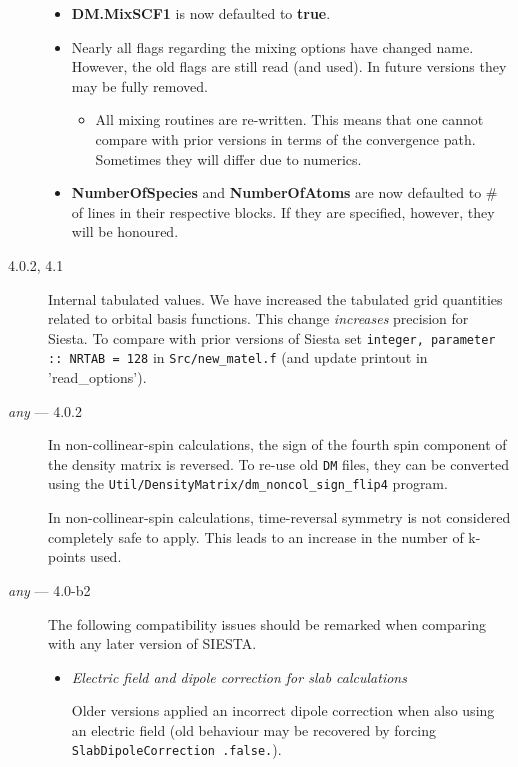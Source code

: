 \documentclass{article}
\newcommand\siesta{\textsc{SIESTA}}
\newcommand{\fdf}[1]{\textbf{#1}}
\newcommand{\code}[1]{\texttt{#1}}
\begin{document}
\begin{description}
\begin{itemize}
    \item %
    \fdf{DM.MixSCF1} is now defaulted to \fdf{true}.

    \item %
    Nearly all flags regarding the mixing options have changed name. However, the old
    flags are still read (and used). In future versions they may be fully removed.

    \begin{itemize}
      \item All mixing routines are re-written. This means that one cannot compare with
      prior versions in terms of the convergence path. Sometimes they will differ due to numerics.
    \end{itemize}

    \item \fdf{NumberOfSpecies} and \fdf{NumberOfAtoms} are now defaulted to \# of lines
    in their respective blocks. If they are specified, however, they will be honoured.

  \end{itemize}


  \item[4.0.2, 4.1] %
  Internal tabulated values. We have increased the tabulated grid quantities related to
  orbital basis functions. This change \emph{increases} precision for Siesta. To compare
  with prior versions of Siesta set \texttt{integer, parameter :: NRTAB = 128} in
  \texttt{Src/new\_matel.f} (and update printout in 'read_options').


  \item[\emph{any} --- 4.0.2] %
  In non-collinear-spin calculations, the sign of the fourth spin
  component of the density matrix is reversed. To re-use old \code{DM} files,
  they can be converted using the
  \code{Util/DensityMatrix/dm_noncol_sign_flip4} program.

  In non-collinear-spin calculations, time-reversal symmetry is not
  considered completely safe to apply. This leads to an increase in
  the number of k-points used.

  \item[\emph{any} --- 4.0-b2] The following compatibility issues should be remarked when
  comparing with any later version of \siesta.

  \begin{itemize}
    \item \emph{Electric field and dipole correction for slab calculations}

    Older versions applied an incorrect dipole correction when also using an
    electric field (old behaviour may be recovered by forcing \code{SlabDipoleCorrection .false.}).


\end{itemize}
\end{description}
\end{document}
